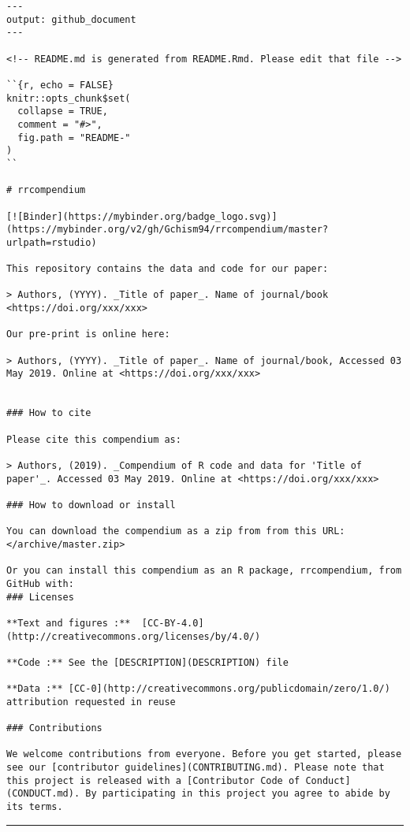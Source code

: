 \documentclass[
  letterpaper,
  DIV=11,
  numbers=noendperiod]{scrreprt}
\begin{document}
\begin{verbatim}
---
output: github_document
---

<!-- README.md is generated from README.Rmd. Please edit that file -->

``{r, echo = FALSE}
knitr::opts_chunk$set(
  collapse = TRUE,
  comment = "#>",
  fig.path = "README-"
)
``

# rrcompendium

[![Binder](https://mybinder.org/badge_logo.svg)](https://mybinder.org/v2/gh/Gchism94/rrcompendium/master?urlpath=rstudio)

This repository contains the data and code for our paper:

> Authors, (YYYY). _Title of paper_. Name of journal/book <https://doi.org/xxx/xxx>

Our pre-print is online here:

> Authors, (YYYY). _Title of paper_. Name of journal/book, Accessed 03 May 2019. Online at <https://doi.org/xxx/xxx>


### How to cite

Please cite this compendium as:

> Authors, (2019). _Compendium of R code and data for 'Title of paper'_. Accessed 03 May 2019. Online at <https://doi.org/xxx/xxx>

### How to download or install

You can download the compendium as a zip from from this URL: </archive/master.zip>

Or you can install this compendium as an R package, rrcompendium, from GitHub with:
### Licenses

**Text and figures :**  [CC-BY-4.0](http://creativecommons.org/licenses/by/4.0/)

**Code :** See the [DESCRIPTION](DESCRIPTION) file

**Data :** [CC-0](http://creativecommons.org/publicdomain/zero/1.0/) attribution requested in reuse

### Contributions

We welcome contributions from everyone. Before you get started, please see our [contributor guidelines](CONTRIBUTING.md). Please note that this project is released with a [Contributor Code of Conduct](CONDUCT.md). By participating in this project you agree to abide by its terms.
\end{verbatim}

\begin{center}\rule{0.5\linewidth}{0.5pt}\end{center}
\end{document}
